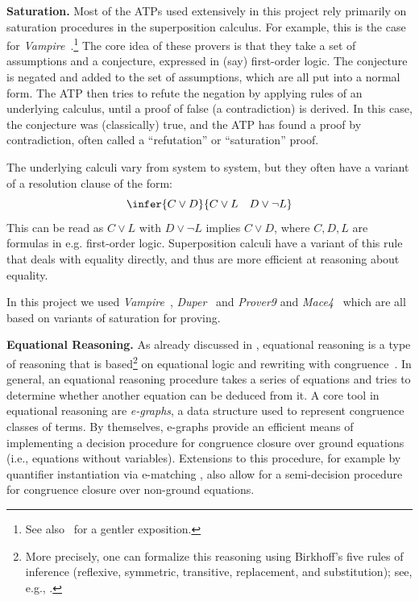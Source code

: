 \textbf{Saturation.}
Most of the ATPs used extensively in this project rely primarily on saturation procedures in the superposition calculus.
For example, this is the case for \emph{Vampire}~\cite{DBLP:conf/cav/KovacsV13}.\footnote{See also~\cite{DBLP:journals/cacm/BentkampBNTVW23} for a gentler exposition.}
The core idea of these provers is that they take a set of assumptions and a conjecture, expressed in (say) first-order logic.
The conjecture is negated and added to the set of assumptions, which are all put into a normal form.
The ATP then tries to refute the negation by applying rules of an underlying calculus, until a proof of false (a contradiction) is derived.
In this case, the conjecture was (classically) true, and the ATP has found a proof by contradiction, often called a ``refutation'' or ``saturation'' proof.

The underlying calculi vary from system to system, but they often have a variant of a resolution clause of the form:
\[\infer{C \lor D}{C \lor L \quad D \lor \neg L} \]
This can be read as $C \lor L$ with $D \lor \neg L$ implies $C \lor D$, where $C, D, L$ are formulas in e.g. first-order logic.
Superposition calculi have a variant of this rule that deals with equality directly, and thus are more efficient at reasoning about equality.

In this project we used \emph{Vampire}~\cite{DBLP:conf/cav/KovacsV13}, \emph{Duper}~\cite{DBLP:conf/itp/CluneQBA24} and \emph{Prover9} and \emph{Mace4}~\cite{prover9-mace4} which are all based on variants of saturation for proving.

\textbf{Equational Reasoning.} As already discussed in , equational reasoning is a type of reasoning that is based\footnote{More precisely, one can formalize this reasoning using Birkhoff's five rules of inference (reflexive, symmetric, transitive, replacement, and substitution); see, e.g., \cite{burris}.} on equational logic and rewriting with congruence~\cite{term-rewriting}.
In general, an equational reasoning procedure takes a series of equations and tries to determine whether another equation can be deduced from it.
A core tool in equational reasoning are \emph{e-graphs}, a data structure used to represent congruence classes of terms.
By themselves, e-graphs provide an efficient means of implementing a decision procedure for congruence closure over ground equations (i.e., equations without variables).
Extensions to this procedure, for example by quantifier instantiation via e-matching \cite{DBLP:conf/cade/MouraB07}, also allow for a semi-decision procedure for congruence closure over non-ground equations.

